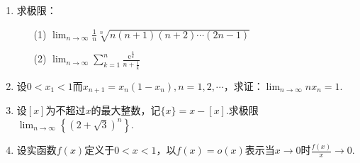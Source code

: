 \begin{enumerate}
\item 求极限：
\begin{enumerate}
	\item[(1)] $\lim _ { n \rightarrow \infty } \frac { 1 } { n } \sqrt [ n ] { n ( n + 1 ) ( n + 2 ) \cdots ( 2 n - 1 ) }$
	\item[(2)] $\lim _ { n \rightarrow \infty } \sum _ { k = 1 } ^ { n } \frac { \mathrm { e } ^ { \frac { k } { n } } } { n + \frac { 1 } { k } }$
\end{enumerate}
\item 设$0<x_{1}<1$而$x _ { n + 1 } = x _ { n } \left( 1 - x _ { n } \right) , n = 1,2 , \cdots$，求证：$\lim_{ n \rightarrow \infty }nx_{n}=1$.
\item 设$[x]$为不超过$x$的最大整数，记$\{ x \} = x - [ x ]$.求极限$\lim _ { n \rightarrow \infty } \left\{ ( 2 + \sqrt { 3 } ) ^ { n } \right\}$.
\item 设实函数$f(x)$定义于$0<x<1$，以$f(x)=o(x)$表示当$x\rightarrow 0$时$\frac { f ( x ) } { x } \rightarrow 0$.


\end{enumerate}
